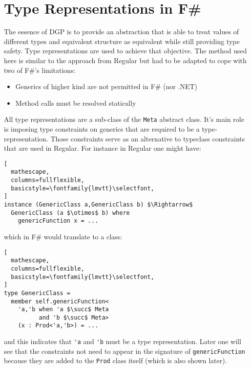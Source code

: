 \documentclass{sigplanconf}
\begin{document}
\section{Type Representations in F\#}
The essence of DGP is to provide an abstraction that is able to treat
values of different types and equivalent structure as equivalent while
still providing type safety. Type representations are used to achieve
that objective. The method used here is similar to the approach from
Regular\cite{Regular} but had to be adapted to cope with two of F\#'s
limitations:
\begin{itemize}
\item Generics of higher kind are not permitted in F\# (nor .NET)
\item Method calls must be resolved statically
\end{itemize}
All type representations are a sub-class of the \verb+Meta+ abstract
class. It's main role is imposing type constraints on generics that
are required to be a type-representation. Those constraints serve as
an alternative to typeclass constraints that are used in Regular. For
instance in Regular one might have:
\begin{lstlisting}[
  mathescape,
  columns=fullflexible,
  basicstyle=\fontfamily{lmvtt}\selectfont,
]
instance (GenericClass a,GenericClass b) $\Rightarrow$
  GenericClass (a $\otimes$ b) where
    genericFunction x = ...
\end{lstlisting}
which in F\# would translate to a class:
\begin{lstlisting}[
  mathescape,
  columns=fullflexible,
  basicstyle=\fontfamily{lmvtt}\selectfont,
]
type GenericClass =
  member self.genericFunction<
    'a,'b when 'a $\succ$ Meta 
          and 'b $\succ$ Meta> 
    (x : Prod<'a,'b>) = ...
\end{lstlisting}
and this indicates that \verb+'a+ and \verb+'b+ must be a type
representation. Later one will see that the constraints not need to
appear in the signature of \verb+genericFunction+ because they are
added to the \verb+Prod+ class itself (which is also shown later).
\end{document}
